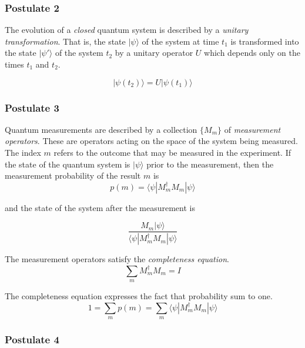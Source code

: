 \subsubsection{Postulate 2}

The evolution of a \textit{closed} quantum system is described by a \textit{unitary transformation}.
That is, the state $|\psi\rangle$ of the system at time $t_1$ is transformed into the state $|\psi'\rangle$ of the system $t_2$ by a unitary operator $U$ which depends only on the times $t_1$ and $t_2$.

\begin{equation}
  |\psi(t_2) \rangle = U|\psi(t_1)\rangle
\end{equation}


\subsubsection{Postulate 3}

Quantum measurements are described by a collection $\{M_m\}$ of \textit{measurement operators}.
These are operators acting on the space of the system being measured. The index $m$ refers to the outcome that may be measured in the experiment.
If the state of the quantum system is $|\psi\rangle$ prior to the measurement, then the measurement probability of the result $m$ is 
\begin{equation}
  p(m) = \langle \psi |M^{\dagger}_m M_m | \psi \rangle
\end{equation}


and the state of the system after the measurement is 

\begin{equation}
  \frac{M_m|\psi\rangle}{\langle \psi |M^{\dagger}_m M_m | \psi \rangle}
\end{equation}


The measurement operators satisfy the \textit{completeness equation}.
\begin{equation}
  \sum_m M^{\dagger}_m M_m = I
\end{equation}


The completeness equation expresses the fact that probability sum to one.
\begin{equation}
  1 = \sum_m p(m) = \sum_m \langle \psi |M^{\dagger}_m M_m | \psi \rangle
\end{equation}


\subsubsection{Postulate 4}

